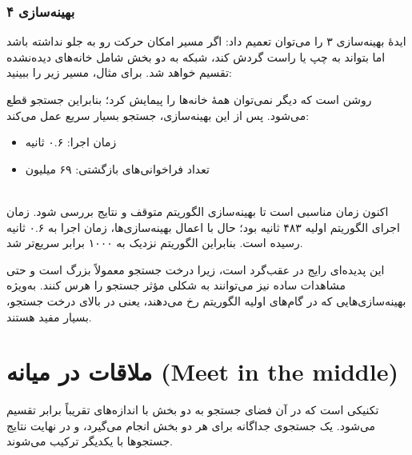 \subsubsection{بهینه‌سازی ۴}

ایدهٔ بهینه‌سازی ۳ را می‌توان تعمیم داد: اگر مسیر امکان حرکت رو به جلو نداشته باشد اما بتواند به چپ یا راست گردش کند، شبکه به دو بخش شامل خانه‌های دیده‌نشده تقسیم خواهد شد. برای مثال، مسیر زیر را ببینید:

\begin{center}
\end{center}
روشن است که دیگر نمی‌توان همهٔ خانه‌ها را پیمایش کرد؛ بنابراین جستجو قطع می‌شود. پس از این بهینه‌سازی، جستجو بسیار سریع عمل می‌کند:

\begin{itemize}
\item
زمان اجرا: ۰.۶ ثانیه
\item
تعداد فراخوانی‌های بازگشتی: ۶۹ میلیون
\end{itemize}

~\\
اکنون زمان مناسبی است تا بهینه‌سازی الگوریتم متوقف و نتایج بررسی شود. زمان اجرای الگوریتم اولیه ۴۸۳ ثانیه بود؛ حال با اعمال بهینه‌سازی‌ها، زمان اجرا به ۰.۶ ثانیه رسیده است. بنابراین الگوریتم نزدیک به ۱۰۰۰ برابر سریع‌تر شد.

این پدیده‌ای رایج در عقب‌گرد است،
زیرا درخت جستجو معمولاً بزرگ است
و حتی مشاهدات ساده نیز می‌توانند به شکلی مؤثر
جستجو را هرس کنند.
به‌ویژه بهینه‌سازی‌هایی که
در گام‌های اولیه الگوریتم رخ می‌دهند،
یعنی در بالای درخت جستجو، بسیار مفید هستند.

\section{ملاقات در میانه (Meet in the middle)}


 تکنیکی است
که در آن فضای جستجو به
دو بخش با اندازه‌های تقریباً برابر تقسیم می‌شود.
یک جستجوی جداگانه
برای هر دو بخش انجام می‌گیرد،
و در نهایت نتایج جستجوها با یکدیگر ترکیب می‌شوند.

